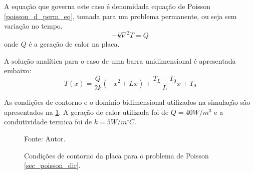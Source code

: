 A equação que governa este caso é denomidada equação de Poisson \eqref{poisson_d_perm_eq}, tomada para um problema permanente, ou seja sem variação no tempo.
\begin{equation}
    -k\nabla^2 T = Q
    \label{poisson_d_perm_eq} 
\end{equation}
onde $Q$ é a geração de calor na placa.

A solução analítica para o caso de uma barra unidimensional é apresentada embaixo:
\begin{equation}
    T(x) = \dfrac{Q}{2k}\left(-x^2 + L x\right) + \dfrac{T_L-T_0}{L} x + T_0
    \label{poisson_d_sol} 
\end{equation}

As condições de contorno e o dominio bidimensional utilizados na simulação são apresentados na \ref{poisson_d_bc}.
A geração de calor utilizada foi de $Q = 40W/m^3$ e a condutividade termica foi de $k=5 W/m^{\circ}C$.
\begin{figure}[H]
    \centering
     {\raggedleft \scriptsize Fonte: Autor.}
    \caption{Condições de contorno da placa para o problema de Poisson \ref{sec_poisson_dir}.}
    \label{poisson_d_bc}
\end{figure}

